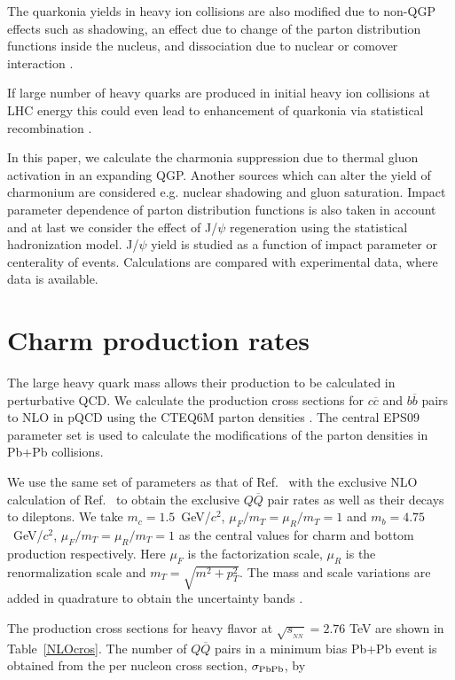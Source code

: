 \documentclass[aps,prc,preprint,superscriptaddress,showpacs,showkeys]{revtex4-1}
\begin{document}
  The quarkonia yields in heavy ion collisions are also modified due to non-QGP effects such as
shadowing, an effect due to change of the parton distribution functions inside the nucleus,
and dissociation due to nuclear or comover interaction \cite{Vogt}.


  If large number of heavy quarks are produced in initial heavy ion collisions at LHC energy 
this could even lead to enhancement of quarkonia via statistical recombination \cite{Rapp1,Rapp2}. 
   
 In this paper, we calculate the charmonia suppression due to thermal gluon activation  in an expanding
QGP. Another sources which can alter the yield of charmonium are considered e.g. nuclear shadowing 
and gluon saturation. Impact parameter dependence of parton distribution functions is also taken in account
and at last we consider the effect of J/$\psi$ regeneration using the statistical hadronization model.
J/$\psi$ yield is studied as a function of impact parameter or centerality of events. Calculations are compared
with experimental data, where data is available.



\section{Charm production rates}

  
  The large heavy quark mass allows their production to be calculated in 
perturbative QCD.  We calculate the production cross sections for 
$c\overline c$ and  $b\overline b$ pairs to NLO in pQCD \cite{GAVIN,LIN} using
the CTEQ6M parton densities \cite{CTEQ6}.  The central EPS09 parameter set 
\cite{EPS09} is used to calculate the modifications of the parton densities in 
Pb+Pb collisions.  
 
 We use the same set of parameters
as that of Ref.~\cite{CNV} with the exclusive NLO calculation of Ref.~\cite{MNR}
to obtain the exclusive $Q \overline Q$ pair rates as well as their decays
to dileptons.  We take $m_c = 1.5$~GeV/$c^2$, $\mu_F/m_T = \mu_R/m_T = 1$ and  
$m_b = 4.75$~GeV/$c^2$, $\mu_F/m_T = \mu_R/m_T = 1$ as the central values for
charm and bottom production respectively.  Here $\mu_F$ is the factorization 
scale, $\mu_R$ is the renormalization scale and $m_T = \sqrt{m^2 + p_T^2}$.  
The mass and scale variations are added in quadrature to obtain the uncertainty
bands \cite{CNV} \cite{ContinuumVKShuk}.
    
  
  The production cross sections for heavy flavor at $\sqrt{s_{_{NN}}}= 2.76$ 
TeV are shown in Table~\ref{NLOcros}.  The number of $Q \overline Q$ pairs
in a minimum bias Pb+Pb event is obtained from the per nucleon cross
section, $\sigma_{\rm PbPb}$, by
\end{document}
